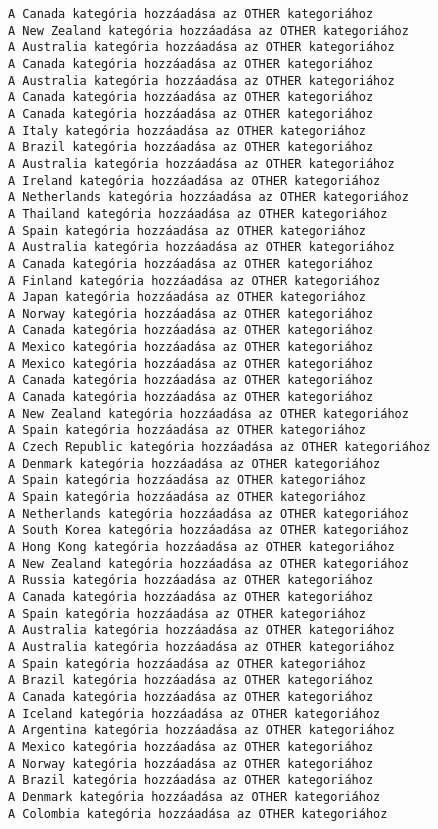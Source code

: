 \documentclass[11pt]{article}
\begin{document}
\begin{Verbatim}[commandchars=\\\{\}]
A Canada kategória hozzáadása az OTHER kategoriához
A New Zealand kategória hozzáadása az OTHER kategoriához
A Australia kategória hozzáadása az OTHER kategoriához
A Canada kategória hozzáadása az OTHER kategoriához
A Australia kategória hozzáadása az OTHER kategoriához
A Canada kategória hozzáadása az OTHER kategoriához
A Canada kategória hozzáadása az OTHER kategoriához
A Italy kategória hozzáadása az OTHER kategoriához
A Brazil kategória hozzáadása az OTHER kategoriához
A Australia kategória hozzáadása az OTHER kategoriához
A Ireland kategória hozzáadása az OTHER kategoriához
A Netherlands kategória hozzáadása az OTHER kategoriához
A Thailand kategória hozzáadása az OTHER kategoriához
A Spain kategória hozzáadása az OTHER kategoriához
A Australia kategória hozzáadása az OTHER kategoriához
A Canada kategória hozzáadása az OTHER kategoriához
A Finland kategória hozzáadása az OTHER kategoriához
A Japan kategória hozzáadása az OTHER kategoriához
A Norway kategória hozzáadása az OTHER kategoriához
A Canada kategória hozzáadása az OTHER kategoriához
A Mexico kategória hozzáadása az OTHER kategoriához
A Mexico kategória hozzáadása az OTHER kategoriához
A Canada kategória hozzáadása az OTHER kategoriához
A Canada kategória hozzáadása az OTHER kategoriához
A New Zealand kategória hozzáadása az OTHER kategoriához
A Spain kategória hozzáadása az OTHER kategoriához
A Czech Republic kategória hozzáadása az OTHER kategoriához
A Denmark kategória hozzáadása az OTHER kategoriához
A Spain kategória hozzáadása az OTHER kategoriához
A Spain kategória hozzáadása az OTHER kategoriához
A Netherlands kategória hozzáadása az OTHER kategoriához
A South Korea kategória hozzáadása az OTHER kategoriához
A Hong Kong kategória hozzáadása az OTHER kategoriához
A New Zealand kategória hozzáadása az OTHER kategoriához
A Russia kategória hozzáadása az OTHER kategoriához
A Canada kategória hozzáadása az OTHER kategoriához
A Spain kategória hozzáadása az OTHER kategoriához
A Australia kategória hozzáadása az OTHER kategoriához
A Australia kategória hozzáadása az OTHER kategoriához
A Spain kategória hozzáadása az OTHER kategoriához
A Brazil kategória hozzáadása az OTHER kategoriához
A Canada kategória hozzáadása az OTHER kategoriához
A Iceland kategória hozzáadása az OTHER kategoriához
A Argentina kategória hozzáadása az OTHER kategoriához
A Mexico kategória hozzáadása az OTHER kategoriához
A Norway kategória hozzáadása az OTHER kategoriához
A Brazil kategória hozzáadása az OTHER kategoriához
A Denmark kategória hozzáadása az OTHER kategoriához
A Colombia kategória hozzáadása az OTHER kategoriához

\end{Verbatim}
\end{document}
